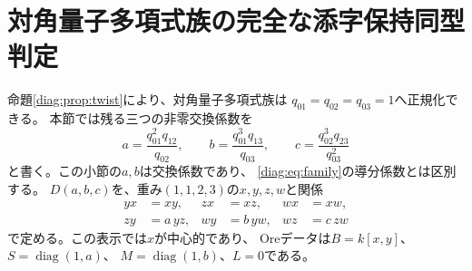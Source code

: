 \documentclass[11pt,a4paper]{ltjsarticle}
\theoremstyle{definition}
\begin{document}
\section{対角量子多項式族の完全な添字保持同型判定}
\label{diag:sec:complete-indexed-isomorphism}
命題\ref{diag:prop:twist}により、対角量子多項式族は
$q_{01}=q_{02}=q_{03}=1$へ正規化できる。
本節では残る三つの非零交換係数を
\begin{equation}\label{diag:eq:normalized-three}
a=\frac{q_{01}^2q_{12}}{q_{02}},\qquad
b=\frac{q_{01}^3q_{13}}{q_{03}},\qquad
c=\frac{q_{02}^3q_{23}}{q_{03}^2}
\end{equation}
と書く。この小節の$a,b$は交換係数であり、
\eqref{diag:eq:family}の導分係数とは区別する。
$D(a,b,c)$を、重み$(1,1,2,3)$の$x,y,z,w$と関係
\begin{equation}\label{diag:eq:normalized-presentation}
\begin{aligned}
yx&=xy,& zx&=xz,& wx&=xw,\\
zy&=a\,yz,& wy&=b\,yw,& wz&=c\,zw
\end{aligned}
\end{equation}
で定める。この表示では$x$が中心的であり、
Oreデータは$B=k[x,y]$、$S=\operatorname{diag}(1,a)$、
$M=\operatorname{diag}(1,b)$、$L=0$である。
\end{document}
